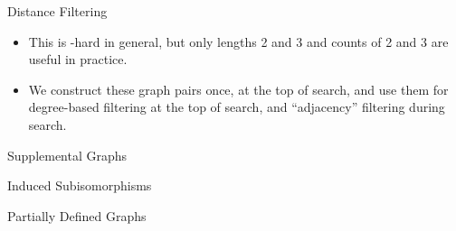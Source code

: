 \documentclass[aspectratio=169,compress,10pt]{beamer}
\begin{document}
\begin{frame}{Distance Filtering}
{\begin{itemize}
            \item This is \NP-hard in general, but only \textcolor{uofgcobalt}{lengths 2 and 3} and
                counts of 2 and 3 are useful in practice.

            \item We construct these graph pairs \textcolor{uofgcobalt}{once, at the top of
                search}, and use them for degree-based filtering at the top of search, and
                ``adjacency'' filtering during search.
        \end{itemize}
    }
\end{frame}

\begin{frame}{Supplemental Graphs}
\end{frame}

\begin{frame}{Induced Subisomorphisms}
\end{frame}

\begin{frame}{Partially Defined Graphs}
\end{frame}
\end{document}
